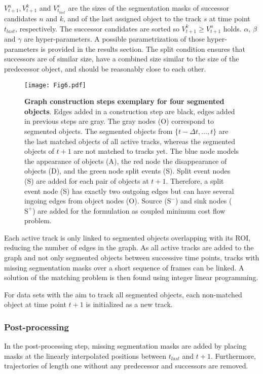 \documentclass[10pt,letterpaper]{article}
\begin{document}
$V^{n}_{t+1}, V^{k}_{t+1}$ and $V^{s}_{t_{last}}$ are the sizes of the segmentation masks of successor candidates $n$ and $k$, and of the last assigned object to the track $s$ at time point $t_{last}$, respectively. The successor candidates are sorted so $V^{k}_{t+1} \geq V^{n}_{t+1}$ holds. $\alpha$, $\beta$ and $\gamma$ are hyper-parameters. A possible parametrization of those hyper-parameters is provided in the results section. The split condition ensures that successors are of similar size, have a combined size similar to the size of the predecessor object, and should be reasonably close to each other. 
\begin{figure}
\begin{adjustwidth}{-2.25in}{0in}
\centering
\texttt{[image: Fig6.pdf]}
\caption{\textbf{Graph construction steps exemplary for four segmented objects}. Edges added in a construction step are black, edges added in previous steps are gray. The gray nodes (O) correspond to segmented objects. The segmented objects from $\{t-\Delta t,...,t\}$ are the last matched objects of all active tracks, whereas the segmented objects of $t+1$ are not matched to tracks yet. The blue node models the appearance of objects (A), the red node the disappearance of objects (D), and the green node split events (S). Split event nodes (S) are added for each pair of objects at $t+1$. Therefore, a split event node (S) has exactly two outgoing edges but can have several ingoing edges from object nodes (O). Source ($\text{S}^-$) and sink nodes ($\text{S}^+$) are added for the formulation as coupled minimum cost flow problem.}
\label{fig:mcf_graph}
\end{adjustwidth}
\end{figure}
 
Each active track is only linked to segmented objects overlapping with its ROI, reducing the number of edges in the graph. As all active tracks are added to the graph and not only segmented objects between successive time points, tracks with missing segmentation masks over a short sequence of frames can be linked. A solution of the matching problem is then found using integer linear programming.

For data sets with the aim to track all segmented objects, each non-matched object at time point $t+1$ is initialized as a new track.

\subsubsection*{Post-processing}
In the post-processing step, missing segmentation masks are added by placing masks at the linearly interpolated positions between $t_{last}$ and $t+1$. Furthermore, trajectories of length one without any predecessor and successors are removed.
\end{document}
